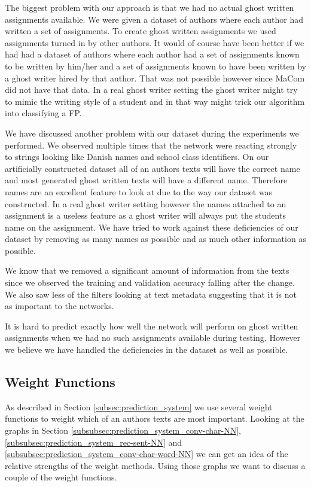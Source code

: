 The biggest problem with our approach is that we had no actual ghost written
assignments available. We were given a dataset of authors where each author had
written a set of assignments. To create ghost written assignments we used
assignments turned in by other authors. It would of course have been better if
we had had a dataset of authors where each author had a set of assignments known
to be written by him/her and a set of assignments known to have been written by
a ghost writer hired by that author. That was not possible however since MaCom
did not have that data. In a real ghost writer setting the ghost writer might
try to mimic the writing style of a student and in that way might trick our
algorithm into classifying a \gls{FP}.

We have discussed another problem with our dataset during the experiments we
performed. We observed multiple times that the network were reacting strongly
to strings looking like Danish names and school class identifiers. On our
artificially constructed dataset all of an authors texts will have the correct
name and most generated ghost written texts will have a different name.
Therefore names are an excellent feature to look at due to the way our dataset
was constructed. In a real ghost writer setting however the names attached to an
assignment is a useless feature as a ghost writer will always put the students
name on the assignment. We have tried to work against these deficiencies of our
dataset by removing as many names as possible and as much other information as
possible.

We know that we removed a significant amount of information from the texts since
we observed the training and validation accuracy falling after the change. We
also saw less of the filters looking at text metadata suggesting that it is not
as important to the networks.

It is hard to predict exactly how well the network will perform on ghost written
assignments when we had no such assignments available during testing. However we
believe we have handled the deficiencies in the dataset as well as possible.


\subsection{Weight Functions}

As described in Section \ref{subsec:prediction_system} we use several weight
functions to weight which of an authors texts are most important. Looking
at the graphs in Section \ref{subsubsec:prediction_system_conv-char-NN},
\ref{subsubsec:prediction_system_rec-sent-NN} and
\ref{subsubsec:prediction_system_conv-char-word-NN} we can get an idea of the
relative strengths of the weight methods. Using those graphs we want to discuss
a couple of the weight functions.

